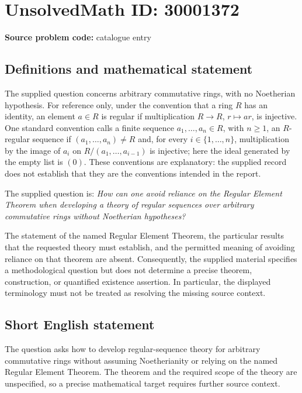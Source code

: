 \documentclass[11pt]{article}
\begin{document}
\section*{UnsolvedMath ID: 30001372}
\textbf{Source problem code:} catalogue entry
\subsection{Definitions and mathematical statement}
The supplied question concerns arbitrary commutative rings, with no Noetherian hypothesis. For reference only, under the convention that a ring \(R\) has an identity, an element \(a\in R\) is regular if multiplication \(R\to R\), \(r\mapsto ar\), is injective. One standard convention calls a finite sequence \(a_1,\ldots,a_n\in R\), with \(n\geq 1\), an \(R\)-regular sequence if \((a_1,\ldots,a_n)\neq R\) and, for every \(i\in\{1,\ldots,n\}\), multiplication by the image of \(a_i\) on \(R/(a_1,\ldots,a_{i-1})\) is injective; here the ideal generated by the empty list is \((0)\). These conventions are explanatory: the supplied record does not establish that they are the conventions intended in the report.

The supplied question is: \emph{How can one avoid reliance on the Regular Element Theorem when developing a theory of regular sequences over arbitrary commutative rings without Noetherian hypotheses?}

The statement of the named Regular Element Theorem, the particular results that the requested theory must establish, and the permitted meaning of avoiding reliance on that theorem are absent. Consequently, the supplied material specifies a methodological question but does not determine a precise theorem, construction, or quantified existence assertion. In particular, the displayed terminology must not be treated as resolving the missing source context.
\subsection{Short English statement}
The question asks how to develop regular-sequence theory for arbitrary commutative rings without assuming Noetherianity or relying on the named Regular Element Theorem. The theorem and the required scope of the theory are unspecified, so a precise mathematical target requires further source context.
\end{document}
